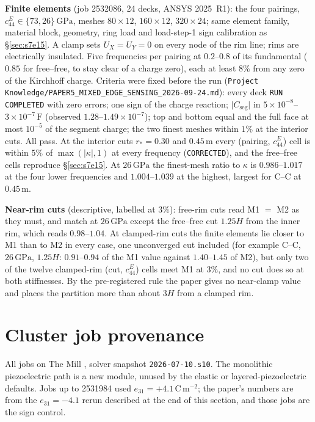 \documentclass[11pt]{article}
\begin{document}
\textbf{Finite elements} (job 2532086, 24 decks, ANSYS 2025~R1): the
four pairings, $c_{44}^E\in\{73,26\}\,\mathrm{GPa}$, meshes
$80\times12$, $160\times12$, $320\times24$; same element family,
material block, geometry, ring load and load-step-1 sign calibration as
\S\ref{sec:s7e15}. A clamp sets $U_X=U_Y=0$ on every node of the rim
line; rims are electrically insulated. Five frequencies per pairing at
$0.2$--$0.8$ of its fundamental ($0.85$ for free--free, to stay clear of a charge zero), each at least $8\%$ from any zero of
the Kirchhoff charge. Criteria were fixed before the run
(\texttt{Project Knowledge/PAPER5\_MIXED\_EDGE\_SENSING\_2026-09-24.md}):
every deck \texttt{RUN COMPLETED} with zero errors; one sign of the
charge reaction; $\lvert C_{\mathrm{seg}}\rvert$ in $5\times10^{-8}$--$3\times10^{-7}\,\mathrm F$ (observed $1.28$--$1.49\times10^{-7}$);
top and bottom equal and the full face at most $10^{-5}$ of the segment
charge; the two finest meshes within $1\%$ at the interior cuts. All
pass. At the interior cuts $r_*=0.30$ and $0.45\,\mathrm m$ every
(pairing, $c_{44}^E$) cell is within $5\%$ of $\max(\lvert\kappa\rvert,1)$
at every frequency (\texttt{CORRECTED}), and the free--free cells
reproduce \S\ref{sec:s7e15}. At $26\,\mathrm{GPa}$ the finest-mesh ratio
to $\kappa$ is $0.986$--$1.017$ at the four lower frequencies and
$1.004$--$1.039$ at the highest, largest for C--C at $0.45\,\mathrm m$.

\textbf{Near-rim cuts} (descriptive, labelled at $3\%$): free-rim cuts
read M1 $=$ M2 as they must, and match at $26\,\mathrm{GPa}$ except the
free--free cut $1.25H$ from the inner rim, which reads $0.98$--$1.04$.
At clamped-rim cuts the finite elements lie closer to M1 than to M2 in
every case, one unconverged cut included (for example C--C, $26\,\mathrm{GPa}$, $1.25H$: $0.91$--$0.94$
of the M1 value against $1.40$--$1.45$ of M2), but only two of the
twelve clamped-rim (cut, $c_{44}^E$) cells meet M1 at $3\%$, and no cut
does so at both stiffnesses. By the pre-registered rule the paper gives
no near-clamp value and places the partition more than about $3H$ from a
clamped rim.

\section{Cluster job provenance}
\label{sec:jobs}
All jobs on The Mill \cite{mill2024}, solver snapshot
\texttt{2026-07-10.s10}. The monolithic piezoelectric path is a new
module, unused by the elastic or layered-piezoelectric defaults. Jobs
up to 2531984 used $e_{31}=+4.1\,\mathrm{C\,m^{-2}}$; the paper's
numbers are from the $e_{31}=-4.1$ rerun described at the end of this
section, and those jobs are the sign control.
\end{document}
